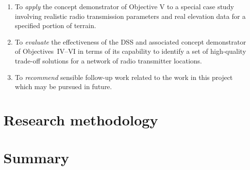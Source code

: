 \begin{enumerate}[label=\Roman*]
 \item To \textit{apply} the concept demonstrator of Objective V to a special case study involving realistic radio transmission parameters and real elevation data for a specified portion of terrain.
 \item To \textit{evaluate} the effectiveness of the DSS and associated concept demonstrator of Objectives~IV--VI in terms of its capability to identify a set of high-quality trade-off solutions for a network of radio transmitter locations.
 \item To \textit{recommend} sensible follow-up work related to the work in this project which may be pursued in future.
\end{enumerate}

\section{Research methodology}
\blindtext

\section{Summary}
\blindtext